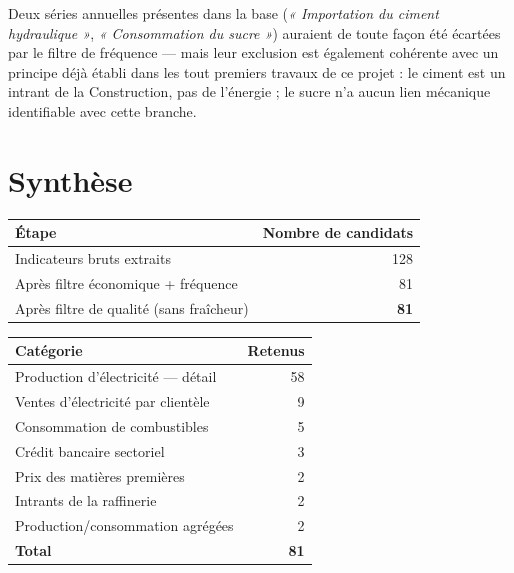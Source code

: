 \documentclass[11pt,a4paper]{article}
\begin{document}
\begin{noteboxbleu}
Deux séries annuelles présentes dans la base (\textit{« Importation du ciment hydraulique »}, \textit{« Consommation du sucre »}) auraient de toute façon été écartées par le filtre de fréquence --- mais leur exclusion est également cohérente avec un principe déjà établi dans les tout premiers travaux de ce projet : le ciment est un intrant de la Construction, pas de l'énergie ; le sucre n'a aucun lien mécanique identifiable avec cette branche.
\end{noteboxbleu}

\section{Synthèse}

\begin{fichebox}
\begin{center}
\begin{tabular}{lr}
\toprule
\textbf{Étape} & \textbf{Nombre de candidats} \\
\midrule
Indicateurs bruts extraits & 128 \\
Après filtre économique + fréquence & 81 \\
Après filtre de qualité (sans fraîcheur) & \textbf{81} \\
\bottomrule
\end{tabular}
\end{center}
\end{fichebox}

\begin{center}
\small
\begin{tabular}{lr}
\toprule
\textbf{Catégorie} & \textbf{Retenus} \\
\midrule
Production d'électricité --- détail & 58 \\
Ventes d'électricité par clientèle & 9 \\
Consommation de combustibles & 5 \\
Crédit bancaire sectoriel & 3 \\
Prix des matières premières & 2 \\
Intrants de la raffinerie & 2 \\
Production/consommation agrégées & 2 \\
\midrule
\textbf{Total} & \textbf{81} \\
\bottomrule
\end{tabular}
\end{center}
\end{document}
